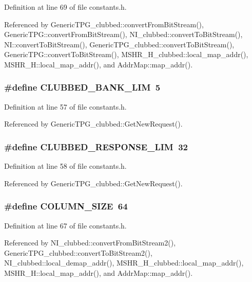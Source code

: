 Definition at line 69 of file constants.h.

Referenced by GenericTPG\_\-clubbed::convertFromBitStream(), GenericTPG::convertFromBitStream(), NI\_\-clubbed::convertToBitStream(), NI::convertToBitStream(), GenericTPG\_\-clubbed::convertToBitStream(), GenericTPG::convertToBitStream(), MSHR\_\-H\_\-clubbed::local\_\-map\_\-addr(), MSHR\_\-H::local\_\-map\_\-addr(), and AddrMap::map\_\-addr().
\subsubsection[{CLUBBED\_\-BANK\_\-LIM}]{\setlength{\rightskip}{0pt plus 5cm}\#define CLUBBED\_\-BANK\_\-LIM~5}\label{constants_8h_8d08d6b9b276404e768aa4c9cf380896}




Definition at line 57 of file constants.h.

Referenced by GenericTPG\_\-clubbed::GetNewRequest().
\subsubsection[{CLUBBED\_\-RESPONSE\_\-LIM}]{\setlength{\rightskip}{0pt plus 5cm}\#define CLUBBED\_\-RESPONSE\_\-LIM~32}\label{constants_8h_7d5805fd5c3d2cb0d184cd9c09d00720}




Definition at line 58 of file constants.h.

Referenced by GenericTPG\_\-clubbed::GetNewRequest().
\subsubsection[{COLUMN\_\-SIZE}]{\setlength{\rightskip}{0pt plus 5cm}\#define COLUMN\_\-SIZE~64}\label{constants_8h_21bae1e9d54eb89cfdf55678040c26b7}




Definition at line 67 of file constants.h.

Referenced by NI\_\-clubbed::convertFromBitStream2(), GenericTPG\_\-clubbed::convertToBitStream2(), NI\_\-clubbed::local\_\-demap\_\-addr(), MSHR\_\-H\_\-clubbed::local\_\-map\_\-addr(), MSHR\_\-H::local\_\-map\_\-addr(), and AddrMap::map\_\-addr().
